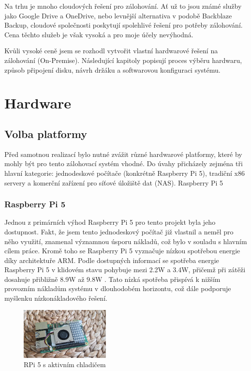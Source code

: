\documentclass[a4paper,12pt, oneside]{book}
\begin{document}
Na trhu je mnoho cloudových řešení pro zálohování. 
Ať už to jsou známé služby jako Google Drive a OneDrive, nebo 
levnější alternativa v podobě Backblaze Backup, cloudové společnosti poskytují 
spolehlivé řešení pro potřeby zálohování. Cena těchto služeb je však vysoká a pro moje účely nevýhodná. 

Kvůli vysoké ceně jsem se rozhodl vytvořit vlastní hardwarové řešení na
zálohování (On-Premise).
Následující kapitoly popisují
proces výběru hardwaru, způsob připojení disku, návrh držáku a softwarovou
konfiguraci systému.


\chapter{Hardware}
\section{Volba platformy}

Před samotnou realizací bylo nutné zvážit různé hardwarové platformy, které by
mohly být pro tento zálohovací systém vhodné. Do úvahy přicházely zejména tři
hlavní kategorie: jednodeskové počítače (konkrétně Raspberry Pi 5), tradiční x86
servery a komerční zařízení pro síťové úložiště dat (NAS). Raspberry Pi 5

\subsection{Raspberry Pi 5}

Jednou z primárních výhod Raspberry Pi 5 pro tento projekt byla jeho dostupnost.
Fakt, že jsem tento jednodeskový počítač již vlastnil a neměl pro něho využití,
znamenal významnou úsporu nákladů, což bylo v souladu s hlavním cílem
práce. Kromě toho se Raspberry Pi 5 vyznačuje nízkou spotřebou energie díky
architektuře ARM. Podle dostupných informací se spotřeba energie Raspberry Pi 5
v klidovém stavu pohybuje mezi 2.2W a 3.4W, přičemž při zátěži dosahuje
přibližně 8.9W až 9.8W . Tato nízká spotřeba přispívá k nižším provozním
nákladům systému v dlouhodobém horizontu, což dále podporuje myšlenku
nízkonákladového řešení.  

\begin{figure}
	\centering
	\includegraphics[width=0.4\textwidth]{img/rpi5-active-cooler-c.jpg}
	\caption{RPi 5 s aktivním chladičem}
\end{figure}
\end{document}

